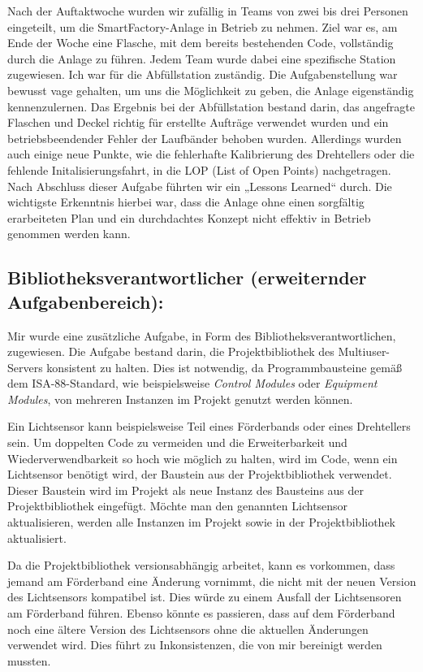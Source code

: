 Nach der Auftaktwoche wurden wir zufällig in Teams von zwei bis drei Personen eingeteilt, um die SmartFactory-Anlage 
in Betrieb zu nehmen. Ziel war es, am Ende der Woche eine Flasche, mit dem bereits bestehenden Code, vollständig durch 
die Anlage zu führen. Jedem Team wurde dabei eine spezifische Station zugewiesen. Ich war für die Abfüllstation zuständig. 
Die Aufgabenstellung war bewusst vage gehalten, um uns die Möglichkeit zu geben, die Anlage eigenständig kennenzulernen. 
Das Ergebnis bei der Abfüllstation bestand darin, das angefragte Flaschen und Deckel richtig für erstellte Aufträge 
verwendet wurden und ein betriebsbeendender Fehler der Laufbänder behoben wurden. Allerdings wurden auch einige neue Punkte, 
wie die fehlerhafte Kalibrierung des Drehtellers oder die fehlende Initalisierungsfahrt, in die LOP (List of Open Points) 
nachgetragen. Nach Abschluss dieser Aufgabe führten wir ein „Lessons Learned“ durch. Die wichtigste Erkenntnis hierbei war, 
dass die Anlage ohne einen sorgfältig erarbeiteten Plan und ein durchdachtes Konzept nicht effektiv in Betrieb 
genommen werden kann.

\subsection{Bibliotheksverantwortlicher (erweiternder Aufgabenbereich):} 

Mir wurde eine zusätzliche Aufgabe, in Form des Bibliotheksverantwortlichen, zugewiesen. Die Aufgabe bestand darin, 
die Projektbibliothek des Multiuser-Servers konsistent zu halten. Dies ist notwendig, da Programmbausteine gemäß dem 
ISA-88-Standard, wie beispielsweise \textit{Control Modules} oder \textit{Equipment Modules}, von mehreren Instanzen im 
Projekt genutzt werden können.

Ein Lichtsensor kann beispielsweise Teil eines Förderbands oder eines Drehtellers sein. Um doppelten Code zu vermeiden und 
die Erweiterbarkeit und Wiederverwendbarkeit so hoch wie möglich zu halten, wird im Code, wenn ein Lichtsensor benötigt wird, der Baustein aus der 
Projektbibliothek verwendet. Dieser Baustein wird im Projekt als neue Instanz des Bausteins aus der Projektbibliothek 
eingefügt. Möchte man den genannten Lichtsensor aktualisieren, werden alle Instanzen im Projekt sowie in der 
Projektbibliothek aktualisiert.

Da die Projektbibliothek versionsabhängig arbeitet, kann es vorkommen, dass jemand am Förderband eine Änderung vornimmt, die 
nicht mit der neuen Version des Lichtsensors kompatibel ist. Dies würde zu einem Ausfall der Lichtsensoren am Förderband 
führen. Ebenso könnte es passieren, dass auf dem Förderband noch eine ältere Version des Lichtsensors ohne die aktuellen 
Änderungen verwendet wird. Dies führt zu Inkonsistenzen, die von mir bereinigt werden mussten.

